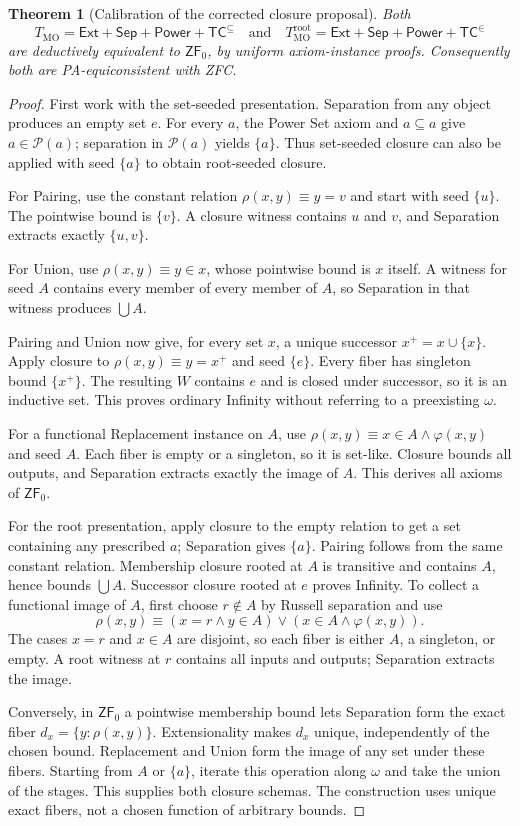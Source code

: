 \documentclass[11pt,letterpaper]{article}
\newtheorem{theorem}{Theorem}[section]
\theoremstyle{definition}\newtheorem{definition}[theorem]{Definition}
\theoremstyle{remark}\newtheorem{remark}[theorem]{Remark}
\newcommand{\ZFz}{\mathsf{ZF}_{0}}
\newcommand{\Ext}{\mathsf{Ext}}
\newcommand{\Sep}{\mathsf{Sep}}
\newcommand{\Pow}{\mathcal{P}}
\newcommand{\TC}{\mathsf{TC}}
\begin{document}
\begin{theorem}[Calibration of the corrected closure proposal]
\label{thm:MO}
Both
\[
 T_{\mathrm{MO}}=\Ext+\Sep+\mathsf{Power}+\TC^{\subseteq}
 \quad\text{and}\quad
 T_{\mathrm{MO}}^{\mathrm{root}}
       =\Ext+\Sep+\mathsf{Power}+\TC^{\in}
\]
are deductively equivalent to $\ZFz$, by uniform axiom-instance proofs.
Consequently both are PA-equiconsistent with ZFC.
\end{theorem}
\begin{proof}
First work with the set-seeded presentation. Separation from any object
produces an empty set $e$. For every $a$, the Power Set axiom and
$a\subseteq a$ give $a\in\Pow(a)$; separation in $\Pow(a)$ yields
$\{a\}$. Thus set-seeded closure can also be applied with seed $\{a\}$
to obtain root-seeded closure.

For Pairing, use the constant relation $\rho(x,y)\equiv y=v$ and start
with seed $\{u\}$. The pointwise bound is $\{v\}$. A closure witness
contains $u$ and $v$, and Separation extracts exactly $\{u,v\}$.

For Union, use $\rho(x,y)\equiv y\in x$, whose pointwise bound is $x$
itself. A witness for seed $A$ contains every member of every member of
$A$, so Separation in that witness produces $\bigcup A$.

Pairing and Union now give, for every set $x$, a unique successor
$x^+=x\cup\{x\}$. Apply closure to
$\rho(x,y)\equiv y=x^+$ and seed $\{e\}$. Every fiber has singleton
bound $\{x^+\}$. The resulting $W$ contains $e$ and is closed under
successor, so it is an inductive set. This proves ordinary Infinity
without referring to a preexisting $\omega$.

For a functional Replacement instance on $A$, use
$\rho(x,y)\equiv x\in A\land\varphi(x,y)$ and seed $A$.
Each fiber is empty or a singleton, so it is set-like. Closure bounds all
outputs, and Separation extracts exactly the image of $A$.
This derives all axioms of $\ZFz$.

For the root presentation, apply closure to the empty relation to get a
set containing any prescribed $a$; Separation gives $\{a\}$.
Pairing follows from the same constant relation. Membership closure
rooted at $A$ is transitive and contains $A$, hence bounds $\bigcup A$.
Successor closure rooted at $e$ proves Infinity. To collect a functional
image of $A$, first choose $r\notin A$ by Russell separation and use
\[
 \rho(x,y)\equiv
   (x=r\land y\in A)\lor(x\in A\land\varphi(x,y)).
\]
The cases $x=r$ and $x\in A$ are disjoint, so each fiber is either $A$,
a singleton, or empty. A root witness at $r$ contains all inputs and
outputs; Separation extracts the image.

Conversely, in $\ZFz$ a pointwise membership bound lets Separation form
the exact fiber $d_x=\{y:\rho(x,y)\}$. Extensionality makes $d_x$
unique, independently of the chosen bound. Replacement and Union form
the image of any set under these fibers. Starting from $A$ or $\{a\}$,
iterate this operation along $\omega$ and take the union of the stages.
This supplies both closure schemas. The construction uses unique exact
fibers, not a chosen function of arbitrary bounds.
\end{proof}
\end{document}

